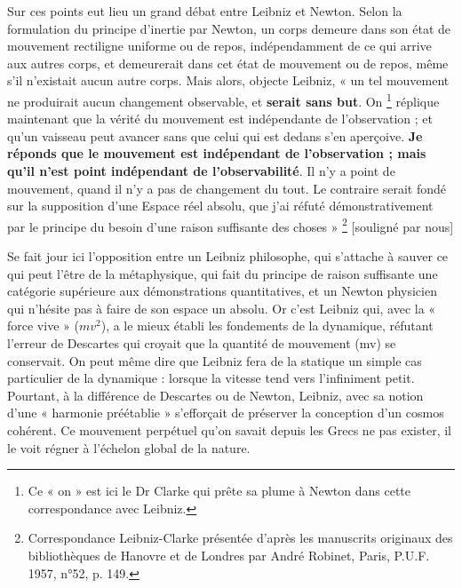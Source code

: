 \documentclass[a4paper,12pt]{article}
\begin{document}
Sur ces points eut lieu un grand débat entre Leibniz et Newton. Selon la formulation du principe d’inertie par Newton, un corps demeure dans son état de mouvement rectiligne uniforme ou de repos, indépendamment de ce qui arrive aux autres corps, et demeurerait dans cet état de mouvement ou de repos, même s’il n’existait aucun autre corps. Mais alors, objecte Leibniz, « un tel mouvement ne produirait aucun changement observable, et  \textbf{serait sans but}. On \footnote{Ce « on » est ici le Dr Clarke qui prête sa plume à Newton dans cette correspondance avec Leibniz.} réplique maintenant que la vérité du mouvement est indépendante de l’observation ; et qu’un vaisseau peut avancer sans que celui qui est dedans s’en aperçoive.  \textbf{Je réponds que le mouvement est indépendant de l’observation ; mais qu’il n’est point indépendant de l’observabilité}. Il n’y a point de mouvement, quand il n’y a pas de changement du tout. Le contraire serait fondé sur la supposition d’une Espace réel absolu, que j’ai réfuté démonstrativement par le principe du besoin d’une raison suffisante des choses » \footnote{Correspondance Leibniz-Clarke présentée d’après les manuscrits originaux des bibliothèques de Hanovre et de Londres par André Robinet, Paris, P.U.F. 1957, n°52, p. 149.} [souligné par nous]

Se fait jour ici l'opposition entre un Leibniz philosophe, qui s'attache à sauver ce qui peut l'être de la métaphysique, qui fait du principe de raison suffisante une catégorie supérieure aux démonstrations quantitatives, et un Newton physicien qui n'hésite pas à faire de son espace un absolu. Or c’est Leibniz qui, avec la « force vive » ($mv^2$), a le mieux établi les fondements de la dynamique, réfutant l'erreur de Descartes qui croyait que la quantité de mouvement (mv) se conservait. On peut même dire que Leibniz fera de la statique un simple cas particulier de la dynamique : lorsque la vitesse tend vers l'infiniment petit. Pourtant, à la différence de Descartes ou de Newton, Leibniz, avec sa notion d’une « harmonie préétablie » s'efforçait de préserver la conception d'un cosmos cohérent. Ce mouvement perpétuel qu'on savait depuis les Grecs ne pas exister, il le voit régner à l'échelon global de la nature. 
\end{document}

